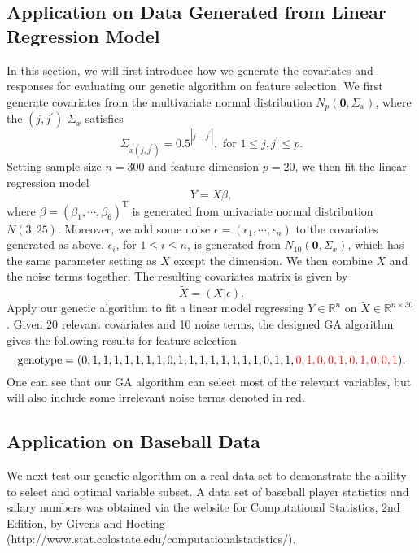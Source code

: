 \documentclass{article}
\begin{document}
\subsection{Application on Data Generated from Linear Regression Model}
In this section, we will first introduce how we generate the covariates and responses for evaluating our genetic algorithm on feature selection. We first generate covariates from the multivariate normal distribution $N_{p}(\bm{0}, \Sigma_{x})$, where the $(j, j^{\prime})$ $\Sigma_{x}$ satisfies
$$
\Sigma_{x(j,j^{\prime})} = 0.5^{|j-j^{\prime}|}, \mbox{ for } 1\leq j, j^{\prime}\leq p.
$$
Setting sample size $n=300$ and feature dimension $p=20$, we then fit the linear regression model
$$
Y = X\beta,
$$
where $\beta=(\beta_{1}, \cdots, \beta_{6})^{\mathrm{T}}$ is generated from univariate normal distribution $N(3, 25)$. Moreover, we add some noise $\epsilon=(\epsilon_{1}, \cdots, \epsilon_{n})$ to the covariates generated as above. $\epsilon_{i}$, for $1\leq i \leq n$, is generated from $N_{10}(\bm{0}, \Sigma_{x})$, which has the same parameter setting as $X$ except the dimension. We then combine $X$ and the noise terms together. The resulting covariates matrix is given by
$$
\tilde{X} = (X|\epsilon).
$$
Apply our genetic algorithm to fit a linear model regressing $Y\in \mathbb{R}^{n}$ on $\tilde{X}\in \mathbb{R}^{n\times 30}$. Given $20$ relevant covariates and 10 noise terms, the designed GA algorithm gives the following results for feature selection
$$
\mbox{genotype}=(0, 1, 1, 1, 1, 1, 1, 1, 0, 1, 1, 1, 1, 1, 1, 1, 1, 0, 1, 1, \textcolor{red}{0, 1, 0, 0, 1, 0, 1, 0, 0, 1}).
$$
One can see that our GA algorithm can select most of the relevant variables, but will also include some irrelevant noise terms denoted in red.


\subsection{Application on Baseball Data}
We next test our genetic algorithm on a real data set to demonstrate the ability to select and optimal variable subset.  A data set of baseball player statistics and salary numbers was obtained via the website for Computational Statistics, 2nd Edition, by Givens and Hoeting (http://www.stat.colostate.edu/computationalstatistics/).
\end{document}
